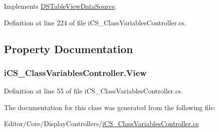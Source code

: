 Implements \hyperlink{interface_d_s_table_view_data_source_a7d1aee71e3dd3201fcb66a94b6a1511e}{D\+S\+Table\+View\+Data\+Source}.



Definition at line 224 of file i\+C\+S\+\_\+\+Class\+Variables\+Controller.\+cs.



\subsection{Property Documentation}
\hypertarget{classi_c_s___class_variables_controller_a8a7a49516deff2ad0975fe2e354e46e2}{
\subsubsection[{View}]{ i\+C\+S\+\_\+\+Class\+Variables\+Controller.\+View\hspace{0.3cm}{\ttfamily [get]}}}\label{classi_c_s___class_variables_controller_a8a7a49516deff2ad0975fe2e354e46e2}


Definition at line 55 of file i\+C\+S\+\_\+\+Class\+Variables\+Controller.\+cs.



The documentation for this class was generated from the following file\+:\begin{DoxyCompactItemize}
\item 
Editor/\+Core/\+Display\+Controllers/\hyperlink{i_c_s___class_variables_controller_8cs}{i\+C\+S\+\_\+\+Class\+Variables\+Controller.\+cs}\end{DoxyCompactItemize}
